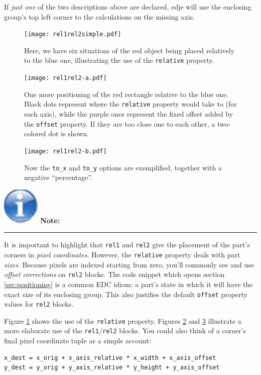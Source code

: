 \documentclass[a4paper]{profusion}
\newenvironment{myboxenv}[1]
  {
    \begin{flushright}
      \begin{boxedminipage}{0.9\textwidth}
        \textbf{%
          \large #1:}

        \hspace{-5pt}\rule{0.3\textwidth}{0.5pt}
        \begin{center}
          \begin{minipage}{0.95\textwidth}

            \small%
         }
          {
          \end{minipage}
        \end{center}
      \end{boxedminipage}
    \end{flushright}
 }
\newenvironment{note}
  {
    \begin{myboxenv}{
        \includegraphics[scale=0.4]{images/note.pdf}
        Note}
   }
    {
    \end{myboxenv}
 }
\begin{document}
If \emph{just one} of the two descriptions above are declared, edje
will use the enclosing group's top left corner to the calculations on
the missing axis.

\begin{figure}
  \centering
  \texttt{[image: rel1rel2simple.pdf]}
  \caption{Here, we have six situations of the red object being placed
    relatively to the blue one, illustrating the use of the
    \texttt{relative} property.}
  \label{fig:rel1rel2simple}
\end{figure}

\begin{figure}
  \centering
  \texttt{[image: rel1rel2-a.pdf]}
  \caption{One more positioning of the red rectangle relative to the
    blue one. Black dots represent where the \texttt{relative}
    property would take to (for each axis), while the purple ones
    represent the fixed offset added by the \texttt{offset}
    property. If they are too close one to each other, a two-colored
    dot is shown.}
  \label{fig:rel1rel2-a}
\end{figure}

\begin{figure}
  \centering
  \texttt{[image: rel1rel2-b.pdf]}
  \caption{Now the \texttt{to\_x} and \texttt{to\_y} options are
    exemplified, together with a negative ``percentage''.}
  \label{fig:rel1rel2-b}
\end{figure}

\begin{note}
It is important to highlight that \texttt{rel1} and \texttt{rel2} give
the placement of the part's corners in \emph{pixel coordinates}.
However, the \texttt{relative} property deals with part \emph{sizes}.
Because pixels are indexed starting from zero, you'll commonly see and
use \emph{offset corrections} on \texttt{rel2} blocks. The code
snippet which opens section \ref{sec:positioning} is a common EDC
idiom: a part's state in which it will have the exact size of its
enclosing group. This also justifies the default \texttt{offset}
property values for \texttt{rel2} blocks.
\end{note}

Figure \ref{fig:rel1rel2simple} shows the use of the \texttt{relative}
property. Figures \ref{fig:rel1rel2-a} and \ref{fig:rel1rel2-b}
illustrate a more elaborate use of the \texttt{rel1}/\texttt{rel2}
blocks. You could also think of a corner's final pixel coordinate
tuple as a simple account:

\begin{verbatim}
x_dest = x_orig + x_axis_relative * x_width + x_axis_offset
y_dest = y_orig + y_axis_relative * y_height + y_axis_offset
\end{verbatim}
\end{document}

